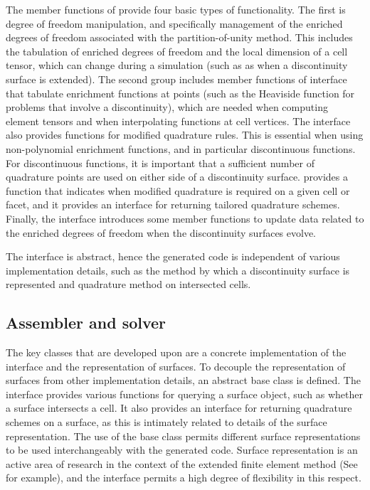 The member functions of  provide four basic types
of functionality. The first is degree of freedom manipulation, and
specifically management of the enriched degrees of freedom associated
with the partition-of-unity method.  This includes the tabulation of
enriched degrees of freedom and the local dimension of a cell tensor,
which can change during a simulation (such as as when a discontinuity
surface is extended). The second group includes member functions
of  interface that tabulate enrichment functions at
points (such as the Heaviside function for problems that involve a
discontinuity), which are needed when computing element tensors and
when interpolating functions at cell vertices. The 
interface also provides functions for modified quadrature rules. This
is essential when using non-polynomial enrichment functions, and in
particular discontinuous functions. For discontinuous functions, it is
important that a sufficient number of quadrature points are used on either
side of a discontinuity surface.  provides a function
that indicates when modified quadrature is required on a given cell or
facet, and it provides an interface for returning tailored quadrature
schemes. Finally, the  interface introduces some member
functions to update data related to the enriched degrees of freedom when
the discontinuity surfaces evolve.

The  interface is abstract, hence the generated code is
independent of various implementation details, such as the method by
which a discontinuity surface is represented and quadrature method on
intersected cells.

\subsection{Assembler and solver}

The key classes that are developed upon \dolfin{} are a concrete
implementation of the  interface and the representation
of surfaces. To decouple the representation of surfaces from other
implementation details, an abstract base class  is
defined. The  interface provides various functions
for querying a surface object, such as whether a surface intersects
a cell.  It also provides an interface for returning quadrature
schemes on a surface, as this is intimately related to details of the
surface representation.  The use of the base class 
permits different surface representations to be used interchangeably
with the generated code. Surface representation is an active area of
research in the context of the extended finite element method (See
\citep{JagerSteinmannKuhl2008} for example), and the
 interface permits a high degree of flexibility in
this respect.

